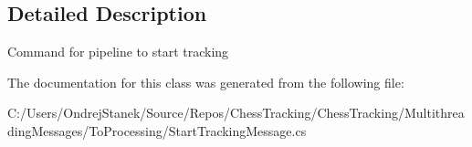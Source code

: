 \subsection{Detailed Description}
Command for pipeline to start tracking 



The documentation for this class was generated from the following file\+:\begin{DoxyCompactItemize}
\item 
C\+:/\+Users/\+Ondrej\+Stanek/\+Source/\+Repos/\+Chess\+Tracking/\+Chess\+Tracking/\+Multithreading\+Messages/\+To\+Processing/Start\+Tracking\+Message.\+cs\end{DoxyCompactItemize}
